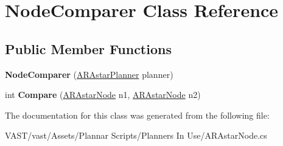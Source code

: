 \hypertarget{class_node_comparer}{\section{Node\-Comparer Class Reference}
\label{class_node_comparer}
}
\subsection*{Public Member Functions}
\begin{DoxyCompactItemize}
\item 
\hypertarget{class_node_comparer_ae9d57c1351837629d2227a952a580326}{{\bfseries Node\-Comparer} (\hyperlink{class_a_r_astar_planner}{A\-R\-Astar\-Planner} planner)}\label{class_node_comparer_ae9d57c1351837629d2227a952a580326}

\item 
\hypertarget{class_node_comparer_a1d1cc1dcf638d05f91398876ab8ba4b2}{int {\bfseries Compare} (\hyperlink{class_a_r_astar_node}{A\-R\-Astar\-Node} n1, \hyperlink{class_a_r_astar_node}{A\-R\-Astar\-Node} n2)}\label{class_node_comparer_a1d1cc1dcf638d05f91398876ab8ba4b2}

\end{DoxyCompactItemize}


The documentation for this class was generated from the following file\-:\begin{DoxyCompactItemize}
\item 
V\-A\-S\-T/vast/\-Assets/\-Plannar Scripts/\-Planners In Use/A\-R\-Astar\-Node.\-cs\end{DoxyCompactItemize}
